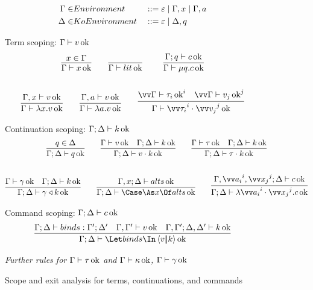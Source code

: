 \documentclass{article}
\begin{document}
\begin{figure}[h]
\centering
\begin{gather*}
\begin{aligned}
  \Gamma \in& Environment
  &
  &::= \varepsilon
  \mid \Gamma, x
  \mid \Gamma, a
  \\
  \Delta \in& KoEnvironment
  &
  &::= \varepsilon
  \mid \Delta, q
\end{aligned}
\end{gather*}

Term scoping: $\Gamma \vdash v \operatorname{ok}$
\begin{gather*}
  \infer
  {\Gamma \vdash x \Ok}
  {x \in \Gamma}
  \qquad
  \axiom{\Gamma \vdash \lit \Ok}
  \qquad
  \infer
  {\Gamma \vdash \compute q \com \Ok}
  {
    \Gamma; q \vdash \com \Ok
  }
  \\\\
  \infer
  {\Gamma \vdash \fn x \tm \Ok}
  {
    \Gamma, x \vdash \tm \Ok
  }
  \qquad
  \infer
  {\Gamma \vdash \fn a \tm \Ok}
  {
    \Gamma, a \vdash \tm \Ok
  }
  \qquad
  \infer
  {\Gamma \vdash \packs{\vect[i]{\ty_i}}{\vect[j]{\tm_j}} \Ok}
  {
    \vect[i]{\Gamma \vdash \ty_i \Ok}
    &
    \vect[j]{\Gamma \vdash \tm_j \Ok}
  }
\end{gather*}

Continuation scoping: $\Gamma; \Delta \vdash k \operatorname{ok}$
\begin{gather*}
  \infer
  {\Gamma;\Delta \vdash q \Ok}
  {q \in \Delta}
  \qquad
  \infer
  {\Gamma;\Delta \vdash \app{\tm}{\ko} \Ok}
  {
    \Gamma \vdash \tm \Ok
    &
    \Gamma;\Delta \vdash \ko \Ok
  }
  \qquad
  \infer
  {\Gamma;\Delta \vdash \app{\ty}{\ko} \Ok}
  {
    \Gamma \vdash \ty \Ok
    &
    \Gamma;\Delta \vdash \ko \Ok
  }
  \\\\
  \infer
  {\Gamma;\Delta \vdash \koerce{\cn}{\ko} \Ok}
  {
    \Gamma \vdash \cn \Ok
    &
    \Gamma;\Delta \vdash \ko \Ok
  }
  \qquad
  \infer
  {\Gamma;\Delta \vdash \caseas{x}{\alts} \Ok}
  {
    \Gamma, x;\Delta \vdash \alts \Ok
  }
  \qquad
  \infer
  {\Gamma;\Delta \vdash \fnk{\packs{\vect[i]{a_i}}{\vect[j]{x_j}}} \com \Ok}
  {
    \Gamma,\vect[i]{a_i},\vect[j]{x_j};\Delta \vdash \com \Ok
  }
\end{gather*}

Command scoping: $\Gamma; \Delta \vdash c \operatorname{ok}$
\begin{gather*}
  \infer
  {\Gamma;\Delta \vdash \mcut{\tm}{\ko}{\binds} \Ok}
  {
    \Gamma;\Delta \vdash \binds : \Gamma';\Delta'
    &
    \Gamma,\Gamma' \vdash \tm \Ok
    &
    \Gamma,\Gamma'; \Delta,\Delta' \vdash \ko \Ok
  }
\end{gather*}


\emph{Further rules for $\Gamma \vdash \tau \operatorname{ok}$ and
  $\Gamma \vdash \kappa \operatorname{ok}$, $\Gamma \vdash \gamma \operatorname{ok}$}
\caption{Scope and exit analysis for terms, continuations, and commands}
\label{fig:scoping-rules}
\end{figure}
\end{document}
